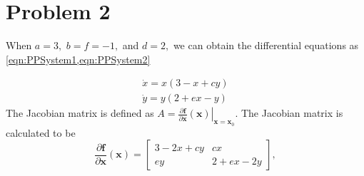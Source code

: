 \documentclass[a4paper,twocolumn]{article} %
\begin{document}
\section{Problem 2}
\label{sec:prob2} 
When 
$a=3,$ $b=f=-1,$ and $d=2,$
  we can obtain the differential equations as \cref{eqn:PPSystem1,eqn:PPSystem2}\par 
\begin{subequations}\label{eqn:PPSystem}
\begin{align}
    \dot{x} = x(3-x+cy) \label{eqn:PPSystem1} \\
    \dot{y} = y(2+ex-y) \label{eqn:PPSystem2}
\end{align}
\end{subequations}
The Jacobian matrix is defined as $A = \left. \frac{\partial\textbf{f}}{\partial \textbf{x}}(\textbf{x}) \right|_{\textbf{x}=\textbf{x}_0}$. The Jacobian matrix is calculated to be
\begin{equation*}
    \frac{\partial\textbf{f}}{\partial \textbf{x}}(\textbf{x}) =
    \left[\begin{array}{cc}
    3-2x+cy & cx \\
    ey & 2+ex-2y
    \end{array}\right],
\end{equation*}
\end{document}
